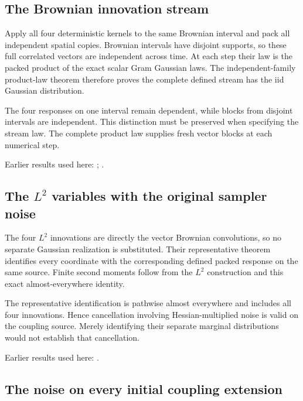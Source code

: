 \documentclass[11pt,a4paper]{report}
\begin{document}
\subsection{\texorpdfstring{The Brownian innovation stream}{The Brownian innovation stream}}
\label{report-step-KineticLangevin-CanonicalKLMC2Noise-lean-2}


Apply all four deterministic kernels to the same Brownian interval and pack all independent spatial copies. Brownian intervals have disjoint supports, so these full correlated vectors are independent across time. At each step their law is the packed product of the exact scalar Gram Gaussian laws. The independent-family product-law theorem therefore proves the complete defined stream has the iid Gaussian distribution.



The four responses on one interval remain dependent, while blocks from disjoint intervals are independent. This distinction must be preserved when specifying the stream law. The complete product law supplies fresh vector blocks at each numerical step.



Earlier results used here: \cite[Section~3.8.16]{LangevinLean2026ULASC}; \cite[Section~3.8.17]{LangevinLean2026ULASC}.
\subsection{\texorpdfstring{The \(L^{2}\) variables with the original sampler noise}{The L² variables with the original sampler noise}}
\label{report-step-KineticLangevin-CanonicalKLMC2Noise-lean-3}


The four \(L^{2}\) innovations are directly the vector Brownian convolutions, so no separate Gaussian realization is substituted. Their representative theorem identifies every coordinate with the corresponding defined packed response on the same source. Finite second moments follow from the \(L^{2}\) construction and this exact almost-everywhere identity.



The representative identification is pathwise almost everywhere and includes all four innovations. Hence cancellation involving Hessian-multiplied noise is valid on the coupling source. Merely identifying their separate marginal distributions would not establish that cancellation.



Earlier results used here: \cite[Section~3.8.17]{LangevinLean2026ULASC}.
\subsection{\texorpdfstring{The noise on every initial coupling extension}{The noise on every initial coupling extension}}
\label{report-step-KineticLangevin-CanonicalKLMC2Noise-lean-4}
\end{document}
